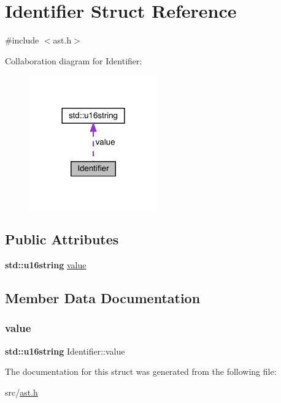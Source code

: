 \hypertarget{struct_identifier}{}\section{Identifier Struct Reference}
\label{struct_identifier}


{\ttfamily \#include $<$ast.\+h$>$}



Collaboration diagram for Identifier\+:\nopagebreak
\begin{figure}[H]
\begin{center}
\leavevmode
\includegraphics[width=156pt]{struct_identifier__coll__graph}
\end{center}
\end{figure}
\subsection*{Public Attributes}
\begin{DoxyCompactItemize}
\item 
\textbf{ std\+::u16string} \hyperlink{struct_identifier_a1deb747305d88d9ccac5137a65838d63}{value}
\end{DoxyCompactItemize}


\subsection{Member Data Documentation}
\mbox{\label{struct_identifier_a1deb747305d88d9ccac5137a65838d63}} 
\subsubsection{\texorpdfstring{value}{value}}
{\footnotesize\ttfamily \textbf{ std\+::u16string} Identifier\+::value}



The documentation for this struct was generated from the following file\+:\begin{DoxyCompactItemize}
\item 
src/\hyperlink{ast_8h}{ast.\+h}\end{DoxyCompactItemize}
